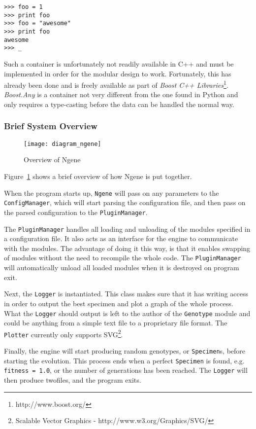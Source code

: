 \begin{verbatim}
>>> foo = 1
>>> print foo
>>> foo = "awesome"
>>> print foo
awesome
>>> _
\end{verbatim}

Such a container is unfortunately not readily available in C++ and must be implemented in order for the modular design to work. Fortunately, this has already been done and is freely available as part of \emph{Boost C++ Libraries}\footnote{http://www.boost.org/}. \emph{Boost.Any}\cite{henney2001} is a container not very different from the one found in Python and only requires a type-casting before the data can be handled the normal way.

\subsubsection{Brief System Overview}
\begin{figure}[ht]
	\centering
	\texttt{[image: diagram\_ngene]}
	\caption{Overview of Ngene}
	\label{fig:diagram_ngene}
\end{figure}

Figure~\ref{fig:diagram_ngene} shows a brief overview of how Ngene is put together.

When the program starts up, \texttt{Ngene} will pass on any parameters to the \texttt{ConfigManager}, which will start parsing the configuration file, and then pass on the parsed configuration to the \texttt{PluginManager}.

The \texttt{PluginManager} handles all loading and unloading of the modules specified in a configuration file. It also acts as an interface for the engine to communicate with the modules. The advantage of doing it this way, is that it enables swapping of modules without the need to recompile the whole code. The \texttt{PluginManager} will automatically unload all loaded modules when it is destroyed on program exit.

Next, the \texttt{Logger} is instantiated. This class makes sure that it has writing access in order to output the best specimen and plot a graph of the whole process. What the \texttt{Logger} should output is left to the author of the \texttt{Genotype} module and could be anything from a simple text file to a proprietary file format. The \texttt{Plotter} currently only supports SVG\footnote{Scalable Vector Graphics - http://www.w3.org/Graphics/SVG/}.

Finally, the engine will start producing random genotypes, or \texttt{Specimen}s, before starting the evolution. This process ends when a perfect \texttt{Specimen} is found, e.g. \texttt{fitness = 1.0}, or the number of generations has been reached. The \texttt{Logger} will then produce twofiles, and the program exits.


